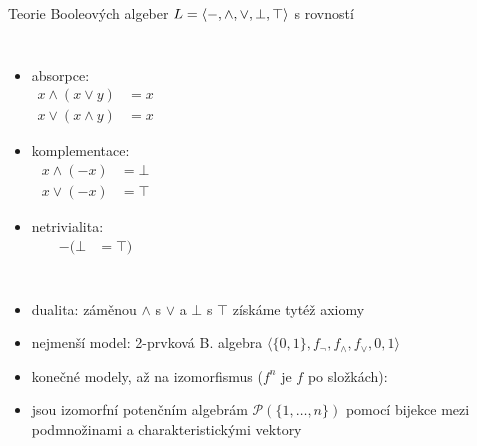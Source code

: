 \documentclass{beamer}
\begin{document}
\begin{frame}{Teorie Booleových algeber \hfill $L=\langle -,{\land},{\lor},\bot,\top\rangle$ s rovností}
{\begin{columns}
        \begin{itemize}
            \item \alert{absorpce}:
            \vspace{-9pt}\begin{align*}
                x\land(x\lor y) &= x\\
                x\lor(x\land y) &= x
            \end{align*}\vspace{-24pt}
            \item \alert{komplementace}:
            \vspace{-9pt}\begin{align*}
                x\land(-x) &= \bot \\
                x\lor(-x) &= \top
            \end{align*}\vspace{-24pt}
            \item \alert{netrivialita}:
            \vspace{-9pt}\begin{align*}
                -(\bot &= \top)
            \end{align*}
        \end{itemize}
                

    \end{columns}
    \vspace{9pt}
    }

    \pause
    \begin{itemize}
        \item dualita: záměnou $\land$ s $\lor$ a $\bot$ s $\top$ získáme tytéž axiomy \pause   
        \item nejmenší model: \alert{2-prvková B. algebra} $\langle \{0,1\},f_\neg,f_\land,f_\lor,0,1\rangle$\pause
        \item konečné modely, až na \alert{izomorfismus} ($f^n$ je $f$ po složkách):
        
        \pause
        \item jsou izomorfní \alert{potenčním algebrám} $\mathcal P(\{1,\dots,n\})$ pomocí bijekce mezi podmnožinami a  charakteristickými vektory
    \end{itemize}
    
\end{frame}
\end{document}
